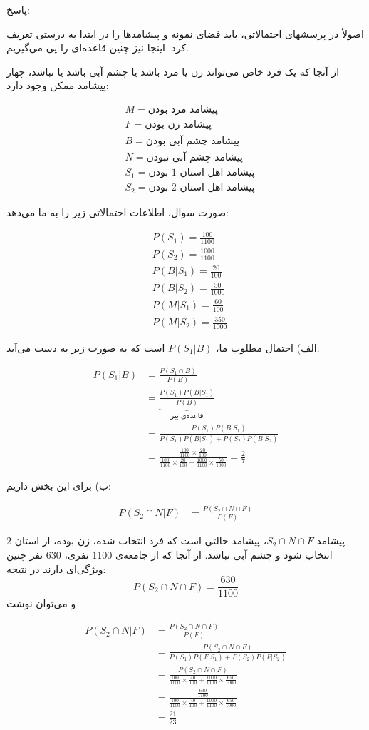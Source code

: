 \documentclass[10pt,letterpaper]{report}
\newcommand{\eqn}[1]{
\[\begin{split}
#1
\end{split}\]
}
\begin{document}
{\color{red}

پاسخ:

اصولأ در پرسشهای احتمالاتی، باید فضای نمونه و پیشامدها را در ابتدا به درستی تعریف کرد.  اینجا نیز چنین قاعده‌ای را پی می‌گیریم.

از آنجا که یک فرد خاص می‌تواند زن یا مرد باشد یا چشم آبی باشد یا نباشد، چهار پیشامد ممکن وجود دارد:

\eqn{
&
M=\text{
پیشامد مرد بودن
}
\\&
F=\text{
پیشامد زن بودن
}
\\&
B=\text{
پیشامد چشم آبی بودن
}
\\&
N=\text{
پیشامد چشم آبی نبودن
}
\\&
S_1=\text{
پیشامد اهل استان 1 بودن
}
\\&
S_2=\text{
پیشامد اهل استان 2 بودن
}
}

صورت سوال، اطلاعات احتمالاتی زیر را به ما می‌دهد:
\eqn{
&
P(S_1)=\frac{100}{1100}
\\&
P(S_2)=\frac{1000}{1100}
\\&
P(B|S_1)=\frac{20}{100}
\\&
P(B|S_2)=\frac{50}{1000}
\\&
P(M|S_1)=\frac{60}{100}
\\&
P(M|S_2)=\frac{350}{1000}
}

الف) احتمال مطلوب ما،
$P(S_1|B)$
است که به صورت زیر به دست می‌آید:
\eqn{
P(S_1|B)&=
\frac{P(S_1\cap B)}{P(B)}
\\&=
\underbrace{\frac{P(S_1)P(B|S_1)}{P(B)}}_{\text{قاعده‌ی بیز}}
\\&=
\frac{P(S_1)P(B|S_1)}{P(S_1)P(B|S_1)+P(S_2)P(B|S_2)}
\\&=
\frac{
\frac{100}{1100}\times \frac{20}{100}
}{
\frac{100}{1100}\times \frac{20}{100}+\frac{1000}{1100}\times \frac{50}{1000}
}
=\frac{2}{7}
}

ب) برای این بخش داریم:

\eqn{
P(S_2\cap N|F)&=
\frac{P(S_2\cap N\cap F)}{P(F)}
}
پیشامد $S_2\cap N\cap F$، پیشامد حالتی است که فرد انتخاب شده، زن بوده، از استان 2 انتخاب شود و چشم آبی نباشد. از آنجا که از جامعه‌ی 1100 نفری، 630 نفر چنین ویژگی‌ای دارند در نتیجه:
$$P(S_2\cap N\cap F)=\frac{630}{1100}$$
و می‌توان نوشت
\eqn{
P(S_2\cap N|F)&=
\frac{P(S_2\cap N\cap F)}{P(F)}
\\&=
\frac{P(S_2\cap N\cap F)}{P(S_1)P(F|S_1)+P(S_2)P(F|S_2)}
\\&=
\frac{P(S_2\cap N\cap F)}{
\frac{100}{1100}\times \frac{40}{100}+\frac{1000}{1100}\times \frac{650}{1000}
}
\\&=
\frac{\frac{630}{1100}}{
\frac{100}{1100}\times \frac{40}{100}+\frac{1000}{1100}\times \frac{650}{1000}
}
\\&=
\frac{21}{23}
}









}
\end{document}
